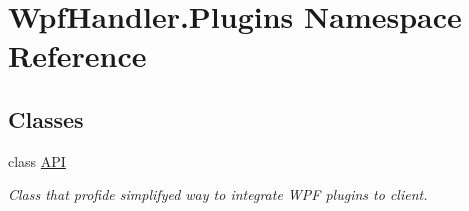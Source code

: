 \hypertarget{namespace_wpf_handler_1_1_plugins}{}\section{Wpf\+Handler.\+Plugins Namespace Reference}
\label{namespace_wpf_handler_1_1_plugins}
\subsection*{Classes}
\begin{DoxyCompactItemize}
\item 
class \mbox{\hyperlink{class_wpf_handler_1_1_plugins_1_1_a_p_i}{A\+PI}}
\begin{DoxyCompactList}\small\item\em Class that profide simplifyed way to integrate W\+PF plugins to client. \end{DoxyCompactList}\end{DoxyCompactItemize}
